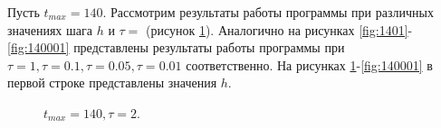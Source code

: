 \documentclass[a4paper,14pt]{article}
\begin{document}
Пусть $t_{max} = 140$. Рассмотрим результаты работы программы
при различных значениях шага  $h$ и $\tau = $ (рисунок \ref{fig:1402}). Аналогично на рисунках
\ref{fig:1401}-\ref{fig:140001} представлены результаты работы программы при $\tau = 1, \tau = 0.1, \tau = 0.05, \tau = 0.01$
соответственно.  На рисунках \ref{fig:1402}-\ref{fig:140001} в первой строке представлены значения $h$.
\begin{figure}[!h]
	\caption{$t_{max} = 140, \tau = 2$.}
	\label{fig:1402}
\end{figure}
\newpage
\end{document}
